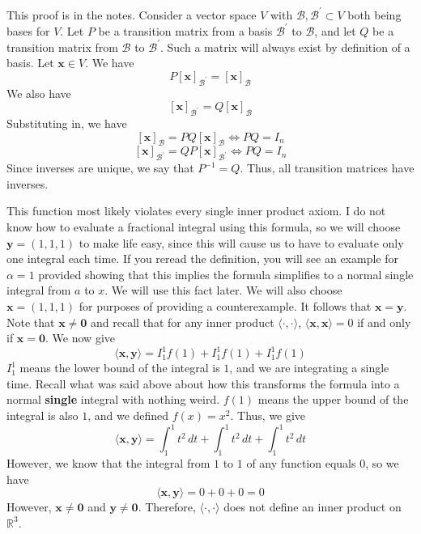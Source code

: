 \documentclass[12pt, letterpaper]{article}
\begin{document}
\begin{solution}
    This proof is in the notes. Consider a vector space \(V\) with \(\mathcal{B} ,\mathcal{B} ^{\prime} \subset V\) both being bases for \(V\). Let \(P\) be a transition matrix from a basis \(\mathcal{B} ^{\prime} \) to \(\mathcal{B} \), and let \(Q\) be a transition matrix from \(\mathcal{B} \) to \(\mathcal{B} ^{\prime} \). Such a matrix will always exist by definition of a basis. Let \(\mathbf{x}\in V\). We have 
    \[
        P[\mathbf{x}]_{\mathcal{B} ^{\prime} } =[\mathbf{x}]_\mathcal{B}
    \]
    We also have
    \[
        [\mathbf{x}]_{\mathcal{B} ^{\prime} }=Q[\mathbf{x}]_\mathcal{B} 
    \]
    Substituting in, we have
    \[
        [\mathbf{x}]_\mathcal{B} =PQ[\mathbf{x}]_\mathcal{B} \iff PQ=I_n
    \]
    \[
        [\mathbf{x}]_{\mathcal{B} ^{\prime} } =QP[\mathbf{x}]_{\mathcal{B} ^{\prime} } \iff PQ=I_n
    \]
    Since inverses are unique, we say that \(P ^{-1} =Q\). Thus, all transition matrices have inverses.
\end{solution}
\begin{solution}
    This function most likely violates every single inner product axiom. I do not know how to evaluate a fractional integral using this formula, so we will choose \(\mathbf{y}=(1,1,1)\) to make life easy, since this will cause us to have to evaluate only one integral each time. If you reread the definition, you will see an example for \(\alpha =1\) provided showing that this implies the formula simplifies to a normal single integral from \(a\) to \(x\). We will use this fact later. We will also choose \(\mathbf{x}=(1,1,1)\) for purposes of providing a counterexample. It follows that \(\mathbf{x}=\mathbf{y}\). Note that \(\mathbf{x}\neq \mathbf{0}\) and recall that for any inner product \(\langle \cdot,\cdot \rangle \), \(\langle \mathbf{x},\mathbf{x} \rangle=0 \) if and only if \(\mathbf{x}=\mathbf{0}\). We now give 
    \[
        \langle \mathbf{x},\mathbf{y} \rangle =I_1^1 f(1)+I_1^1 f(1)+I_1^1 f(1)
    \]
    \(I_1^1\) means the lower bound of the integral is \(1\), and we are integrating a single time. Recall what was said above about how this transforms the formula into a normal \textbf{single} integral with nothing weird. \(f(1)\) means the upper bound of the integral is also \(1\), and we defined \(f(x)=x^2\). Thus, we give
    \[
        \langle \mathbf{x},\mathbf{y} \rangle = \int_1^1 t^2\,dt +\int_1^1 t^2\,dt +\int_1^1 t^2\,dt
    \]
    However, we know that the integral from \(1\) to \(1\) of any function equals \(0\), so we have 
    \[
        \langle \mathbf{x},\mathbf{y} \rangle = 0+0+0=0
    \]
    However, \(\mathbf{x}\neq \mathbf{0}\) and \(\mathbf{y}\neq \mathbf{0}\). Therefore, \(\langle \cdot,\cdot \rangle \) does not define an inner product on \(\mathbb{R}^3\).
\end{solution}
\end{document}
